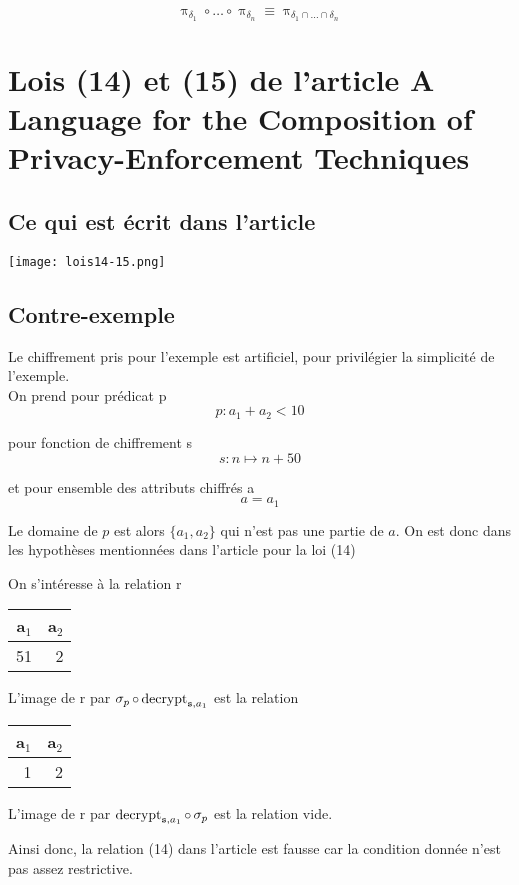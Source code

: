 \documentclass[french]{article}
\DeclareMathOperator{\proj}{\pi}
\DeclareMathOperator{\sel}{\sigma}
\DeclareMathOperator{\decrypt}{decrypt}
\newcommand\typeT[1]{\text{\ttfamily #1}}
\newcommand{\decryptArgs}[2]{\decrypt_{\typeT{#1}, #2}}
\begin{document}
$$
\proj_{\delta_1} \circ \dots \circ \proj_{\delta_n} 
\equiv \proj_{\delta_1 \cap \dots \cap \delta_n}
$$

\section*{Lois (14) et (15) de l'article A Language for the Composition of Privacy-Enforcement Techniques}
\subsection*{Ce qui est écrit dans l'article}
\texttt{[image: lois14-15.png]}

\subsection*{Contre-exemple}
Le chiffrement pris pour l'exemple est artificiel, pour privilégier la simplicité de l'exemple. \\

On prend pour prédicat p 
$$p: a_1 + a_2 < 10$$ 

pour fonction de chiffrement s
$$ s: n \mapsto n + 50 $$

et pour ensemble des attributs chiffrés a
$$ a = {a_1} $$

Le domaine de $p$ est alors $\{a_1, a_2\}$
qui n'est pas une partie de $a$.
On est donc dans les hypothèses mentionnées
dans l'article pour la loi (14)

On s'intéresse à la relation r
\begin{center}
	\begin{tabular}{rr}
		a\(_{\text{1}}\) & a\(_{\text{2}}\)\\
		\hline
		51 & 2\\
	\end{tabular}
\end{center}

L'image de r par
$\sel_p \circ \decryptArgs{s}{a_1}$
est la relation
\begin{center}
	\begin{tabular}{rr}
		a\(_{\text{1}}\) & a\(_{\text{2}}\)\\
		\hline
		1 & 2\\
	\end{tabular}
\end{center}

L'image de r par
$\decryptArgs{s}{a_1} \circ \sel_p$
est la relation vide.

Ainsi donc, la relation (14)
dans l'article est fausse
car la condition donnée n'est pas assez restrictive.
\end{document}
